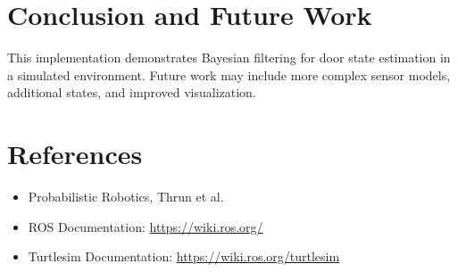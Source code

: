 \documentclass[12pt]{article}
\begin{document}
\section{Conclusion and Future Work}
This implementation demonstrates Bayesian filtering for door state estimation in a simulated environment. Future work may include more complex sensor models, additional states, and improved visualization.
\section{References}
\begin{itemize}
  \item Probabilistic Robotics, Thrun et al.
  \item ROS Documentation: \url{https://wiki.ros.org/}
  \item Turtlesim Documentation: \url{https://wiki.ros.org/turtlesim}
\end{itemize}
\end{document}
